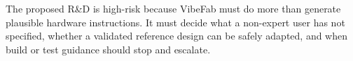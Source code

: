 

The proposed R\&D is high-risk because VibeFab must do more than generate plausible hardware instructions. It must decide what a non-expert user has not specified, whether a validated reference design can be safely adapted, and when build or test guidance should stop and escalate. 

